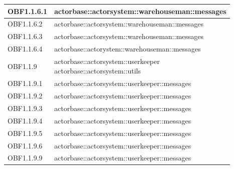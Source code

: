 \documentclass{scalatekids-article}
\begin{document}
\begin{longtable}[H]{|p{6cm}|p{11cm}|}
\hline
OBF1.1.6.1 & \multiLineCell[t]{actorbase::actorsystem::warehouseman::messages\\}\\
\hline
OBF1.1.6.2 & \multiLineCell[t]{actorbase::actorsystem::warehouseman::messages\\}\\
\hline
OBF1.1.6.3 & \multiLineCell[t]{actorbase::actorsystem::warehouseman::messages\\}\\
\hline
OBF1.1.6.4 & \multiLineCell[t]{actorbase::actorystem::warehouseman::messages\\}\\
\hline
OBF1.1.9 & \multiLineCell[t]{actorbase::actorsystem::userkeeper\\actorbase::actorsystem::utils\\}\\
\hline
OBF1.1.9.1 & \multiLineCell[t]{actorbase::actorsystem::userkeeper::messages\\}\\
\hline
OBF1.1.9.2 & \multiLineCell[t]{actorbase::actorsystem::userkeeper::messages\\}\\
\hline
OBF1.1.9.3 & \multiLineCell[t]{actorbase::actorsystem::userkeeper::messages\\}\\
\hline
OBF1.1.9.4 & \multiLineCell[t]{actorbase::actorsystem::userkeeper::messages\\}\\
\hline
OBF1.1.9.5 & \multiLineCell[t]{actorbase::actorsystem::userkeeper::messages\\}\\
\hline
OBF1.1.9.6 & \multiLineCell[t]{actorbase::actorsystem::userkeeper::messages\\}\\
\hline
OBF1.1.9.9 & \multiLineCell[t]{actorbase::actorsystem::userkeeper::messages\\}\\

\end{longtable}
\end{document}
